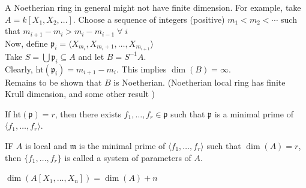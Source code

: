 \documentclass[oneside, 12pt]{scrbook}
\newcommand{\pr}{\mathfrak{p}}
\newcommand{\m}{\mathfrak{m}}
\newcommand{\Ht}{\mathrm{ht}}
\theoremstyle{theorem}
\begin{document}
\begin{remark}
A Noetherian ring in general might not have finite dimension. For example, take $A = k[X_{1}, X_{2} , \hdots ]$. Choose a sequence of integers (positive) $m_{1} < m_{2} <\cdots $ such that $m_{i+1} - m_{i} > m_{i} - m_{i-1} \; \forall \; i$ \\

Now, define $\pr_{i} = \langle X_{m_{i}} , X_{m_{i} + 1} , \hdots , X_{m_{i+1}} \rangle$ \\

Take $S = \bigcup \pr_{i} \subseteq A$ and let $B = S^{-1} A$. \\

Clearly, $\Ht(\pr_{i}) = m_{i+1} - m_{i}$. This implies $\dim (B)=\infty$. \\

Remains to be shown that $B$ is Noetherian. (Noetherian local ring has finite Krull dimension, and some other result )
\end{remark}

\begin{proposition}
If $\Ht(\pr)=r$, then there exists $f_{1}, \hdots , f_{r} \in \pr$ such that $\pr$ is a minimal prime of $\langle f_{1}, \hdots , f_{r} \rangle$.
\end{proposition}

\begin{definition}
IF $A$ is local and $\m$ is the minimal prime of $\langle f_{1} , \hdots , f_{r} \rangle$ such that $\dim (A)=r$, then $\{f_{1}, \hdots , f_{r}\}$ is called a system of parameters of $A$.
\end{definition}

\begin{proposition}
$\dim (A[X_{1}, \hdots ,X_{n}]) = \dim (A) + n$
\end{proposition}
\end{document}
